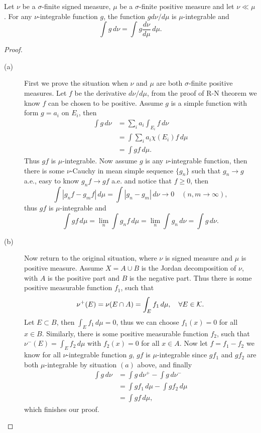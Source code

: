 \begin{pro}%
	Let $\nu$ be a $\sigma$-finite signed measure, $\mu$ be a $\sigma$-finite positive measure and let $\nu\ll\mu$. For any $\nu$-integrable function $g$, the function $g d\nu/d\mu$ is $\mu$-integrable and 
	\[\int g\,d\nu=\int g\frac{d\nu}{d\mu}\,d\mu.\]
\end{pro}
\begin{proof}
	\begin{description}
	\item[(a)] First we prove the situation when $\nu$ and $\mu$ are both $\sigma$-finite positive measures.
	Let $f$ be the derivative $d\nu/d\mu$, from the proof of R-N theorem we know $f$ can be chosen to be positive.
	Assume $g$ is a simple function with form $g=a_i$ on $E_i$, then 
	\begin{align*}
		\int g\,d\nu&=\sum_i a_i \int_{E_i} f\,d\nu\\
		&=\int \sum_i a_i\chi(E_i)f\,d\mu\\
		&=\int gf\,d\mu.
	\end{align*}
	Thus $gf$ is $\mu$-integrable. Now assume $g$ is any $\nu$-integrable function, then there is some $\nu$-Cauchy in mean simple sequence $\{g_n\}$ such that $g_n\to g$ a.e., easy to know $g_nf\to gf$ a.e. and notice that $f\geq 0$, then
	\[\int|g_nf-g_mf|\,d\mu=\int |g_n-g_m|\,d\nu\to0\quad(n,m\to \infty),\]
	thus $gf$ is $\mu$-integrable and 
	\[\int gf\,d\mu=\lim_n \int g_nf\,d\mu=\lim_n \int g_n\,d\nu=\int g\,d\nu.\]
	\item[(b)] Now return to the original situation, where $\nu$ is signed measure and $\mu$ is positive measure.
	Assume $X=A\cup B$ is the Jordan decomposition of $\nu$, with $A$ is the positive part and $B$ is the negative part. Thus there is some positive measurable function $f_1$, such that
	\[\nu^+(E)=\nu(E\cap A)=\int_E f_1\,d\mu,\quad\forall E\in\mathcal{K}.\]
	Let $E\subset B$, then $\int_E f_1\,d\mu=0$, thus we can choose $f_1(x)=0$ for all $x\in B$. Similarly, there is some positive measurable function $f_2$, such that $\nu^-(E)=\int_E f_2\,d\mu$ with $f_2(x)=0$ for all $x\in A$.
	Now let $f=f_1-f_2$ we know for all $\nu$-integrable function $g$, $gf$ is $\mu$-integrable since $gf_1$ and $gf_2$ are both $\mu$-integrable by situation $(a)$ above, and finally
	\begin{align*}
	\int g\,d\nu&=\int g\,d\nu^+-\int g\,d\nu^-\\
				&=\int gf_1\,d\mu-\int gf_2\,d\mu\\
				&=\int gf\,d\mu,
	\end{align*}
	which finishes our proof.
	\end{description}
\end{proof} 

